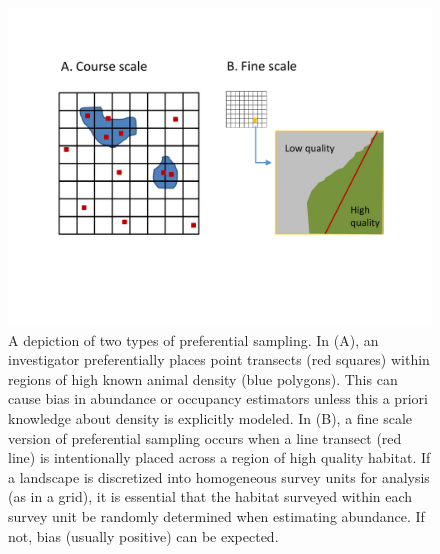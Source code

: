 \documentclass[times,mee,doublespace,]{besauth2}
\begin{document}
\begin{figure} %
\begin{center}
\includegraphics[width=170mm]{Pref_sampling_diag.pdf}
\caption{A depiction of two types of preferential sampling.  In (A), an investigator preferentially places point transects (red squares) within regions of high known animal density (blue polygons).  This can cause bias in abundance or occupancy estimators unless this a priori knowledge about density is explicitly modeled.  In (B), a fine scale version of preferential sampling occurs when a line transect (red line) is intentionally placed across a region of high quality habitat.  If a landscape is discretized into homogeneous survey units for analysis (as in a grid), it is essential that the habitat surveyed within each survey unit be randomly determined when estimating abundance.  If not, bias (usually positive) can be expected.}
\label{fig:pref}
\end{center}
\end{figure}
\end{document}
